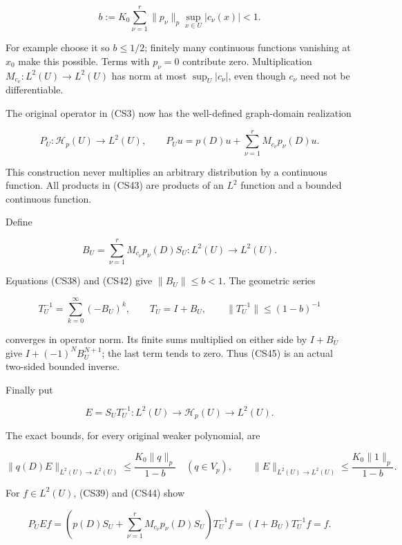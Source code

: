\documentclass[
  11pt,
]{article}
\begin{document}
\[
 b:=K_0\sum_{\nu=1}^r\|p_\nu\|_p\sup_{x\in U}|c_\nu(x)|<1.
                                                                    \tag{CS42}
\]

For example choose it so \(b\leq1/2\); finitely many continuous
functions vanishing at \(x_0\) make this possible. Terms with
\(p_\nu=0\) contribute zero. Multiplication
\(M_{c_\nu}:L^2(U)\to L^2(U)\) has norm at most \(\sup_U|c_\nu|\), even
though \(c_\nu\) need not be differentiable.

The original operator in (CS3) now has the well-defined graph-domain
realization

\[
 P_U:\mathcal H_p(U)\to L^2(U),\qquad
 P_Uu=p(D)u+\sum_{\nu=1}^r M_{c_\nu}p_\nu(D)u.               \tag{CS43}
\]

This construction never multiplies an arbitrary distribution by a
continuous function. All products in (CS43) are products of an \(L^2\)
function and a bounded continuous function.

Define

\[
 B_U=\sum_{\nu=1}^r M_{c_\nu}p_\nu(D)S_U:L^2(U)\to L^2(U).
                                                                    \tag{CS44}
\]

Equations (CS38) and (CS42) give \(\|B_U\|\leq b<1\). The geometric
series

\[
 T_U^{-1}=\sum_{k=0}^{\infty}(-B_U)^k,
 \qquad T_U=I+B_U,
 \qquad \|T_U^{-1}\|\leq(1-b)^{-1}                            \tag{CS45}
\]

converges in operator norm. Its finite sums multiplied on either side by
\(I+B_U\) give \(I+(-1)^NB_U^{N+1}\); the last term tends to zero. Thus
(CS45) is an actual two-sided bounded inverse.

Finally put

\[
 E=S_UT_U^{-1}:L^2(U)\longrightarrow\mathcal H_p(U)
                                      \longrightarrow L^2(U). \tag{CS46}
\]

The exact bounds, for every original weaker polynomial, are

\[
 \|q(D)E\|_{L^2(U)\to L^2(U)}
      \leq\frac{K_0\|q\|_p}{1-b}\quad(q\in V_p),
 \qquad
 \|E\|_{L^2(U)\to L^2(U)}
      \leq\frac{K_0\|1\|_p}{1-b}.                            \tag{CS47}
\]

For \(f\in L^2(U)\), (CS39) and (CS44) show

\[
 P_UEf
 =\left(p(D)S_U+\sum_{\nu=1}^rM_{c_\nu}p_\nu(D)S_U\right)T_U^{-1}f
 =(I+B_U)T_U^{-1}f=f.                                        \tag{CS48}
\]
\end{document}
